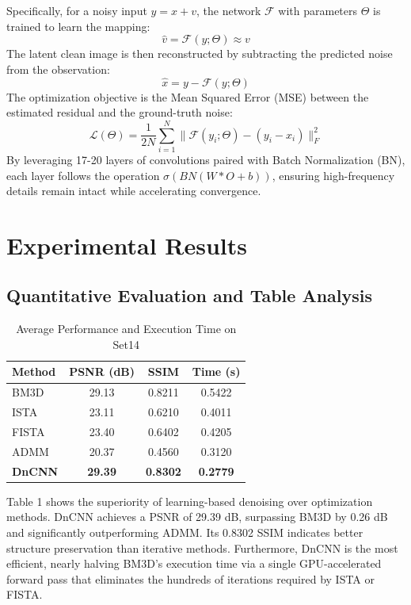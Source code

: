 \documentclass[twocolumn, 10pt]{article}
\begin{document}
Specifically, for a noisy input $y = x + v$, the network $\mathcal{F}$ with parameters $\Theta$ is trained to learn the mapping:
\begin{equation}
\hat{v} = \mathcal{F}(y; \Theta) \approx v
\end{equation}
The latent clean image is then reconstructed by subtracting the predicted noise from the observation:
\begin{equation}
\hat{x} = y - \mathcal{F}(y; \Theta)
\end{equation}
The optimization objective is the Mean Squared Error (MSE) between the estimated residual and the ground-truth noise:
\begin{equation}
\mathcal{L}(\Theta) = \frac{1}{2N} \sum_{i=1}^{N} \| \mathcal{F}(y_i; \Theta) - (y_i - x_i) \|_F^2
\end{equation}
By leveraging 17-20 layers of convolutions paired with Batch Normalization (BN), each layer follows the operation $\sigma(BN(W * O + b))$, ensuring high-frequency details remain intact while accelerating convergence.

\section{Experimental Results}

\subsection{Quantitative Evaluation and Table Analysis}

\begin{table}[!ht] %
\centering
\begin{tabular}{lccc}
\toprule
Method & PSNR (dB) & SSIM & Time (s) \\ \midrule
BM3D   & 29.13 & 0.8211 & 0.5422 \\
ISTA   & 23.11 & 0.6210 & 0.4011 \\
FISTA  & 23.40 & 0.6402 & 0.4205 \\
ADMM   & 20.37 & 0.4560 & 0.3120 \\
\textbf{DnCNN} & \textbf{29.39} & \textbf{0.8302} & \textbf{0.2779} \\ \bottomrule
\end{tabular}
\caption{Average Performance and Execution Time on Set14}
\end{table}

\noindent \justifying
Table 1 shows the superiority of learning-based denoising over optimization methods. DnCNN achieves a PSNR of 29.39 dB, surpassing BM3D by 0.26 dB and significantly outperforming ADMM. Its 0.8302 SSIM indicates better structure preservation than iterative methods. Furthermore, DnCNN is the most efficient, nearly halving BM3D's execution time via a single GPU-accelerated forward pass that eliminates the hundreds of iterations required by ISTA or FISTA. 
\end{document}
